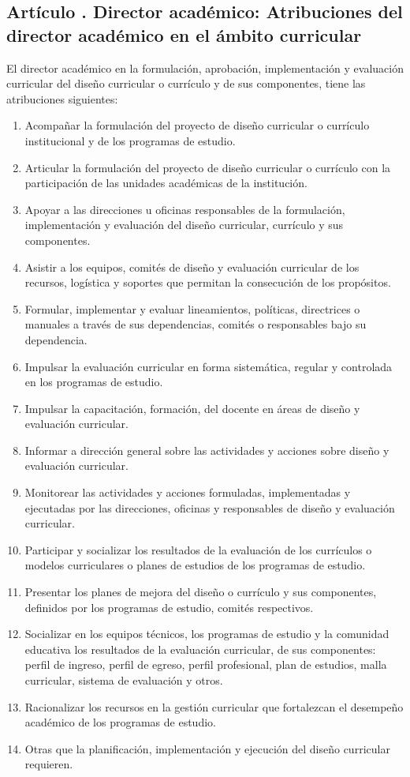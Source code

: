 \subsection{Artículo . Director académico: Atribuciones del director académico en el ámbito curricular}
\addtocounter{ns}{1}
El director académico en la formulación, aprobación, implementación y evaluación curricular del diseño curricular o currículo y de sus componentes, tiene las atribuciones siguientes: 
\begin{enumerate}
\item Acompañar la formulación del proyecto de diseño curricular o currículo institucional y de los programas de estudio. 
\item Articular la formulación del proyecto de diseño curricular o currículo con la participación de las unidades académicas de la institución. 
\item Apoyar a las direcciones u oficinas responsables de la formulación, implementación y evaluación del diseño curricular, currículo y sus componentes. 
\item Asistir a los equipos, comités de diseño y evaluación curricular de los recursos, logística y soportes que permitan la consecución de los propósitos. 
\item Formular, implementar y evaluar lineamientos, políticas, directrices o manuales a través de sus dependencias, comités o responsables bajo su dependencia. 
\item Impulsar la evaluación curricular en forma sistemática, regular y controlada en los programas de estudio. 
\item Impulsar la capacitación, formación, del docente en áreas de diseño y evaluación curricular. 
\item Informar a dirección general sobre las actividades y acciones sobre diseño y evaluación curricular.  
\item Monitorear las actividades y acciones formuladas, implementadas y ejecutadas por las direcciones, oficinas y responsables de diseño y evaluación curricular. 
\item Participar y socializar los resultados de la evaluación de los currículos o modelos curriculares o planes de estudios de los programas de estudio. 
\item Presentar los planes de mejora del diseño o currículo y sus componentes, definidos por los programas de estudio, comités respectivos. 
\item Socializar en los equipos técnicos, los programas de estudio y la comunidad educativa los resultados de la evaluación curricular, de sus componentes: perfil de ingreso, perfil de egreso, perfil profesional, plan de estudios, malla curricular, sistema de evaluación y otros.  
\item Racionalizar los recursos en la gestión curricular que fortalezcan el desempeño académico de los programas de estudio. 
\item Otras que la planificación, implementación y ejecución del diseño curricular requieren. 
\end{enumerate}
